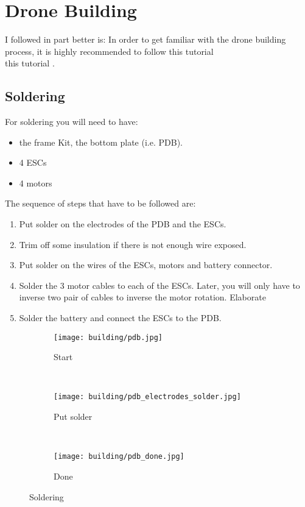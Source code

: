 \chapter{Drone Building}
    I followed in part {\color{red}better is: In order to get familiar with the drone building process, it is highly recommended to follow this tutorial\\} this tutorial \cite{udemy_build_course}.
    
    \section{Soldering}
        For soldering you will need to have:
        \begin{itemize}
            \item the frame Kit, the bottom plate (i.e. PDB).
            \item 4 ESCs
            \item 4 motors
        \end{itemize}
        The sequence of steps that have to be followed are:
        \begin{enumerate}
            \item Put solder on the electrodes of the PDB and the ESCs.
            \item Trim off some insulation if there is not enough wire exposed.
            \item Put solder on the wires of the ESCs, motors and battery connector.
            \item Solder the 3 motor cables to each of the ESCs. Later, you will only have to inverse two pair of cables to inverse the motor rotation. {\color{orange} Elaborate}
            \item Solder the battery and connect the ESCs to the PDB.
        \end{enumerate}
        \begin{figure}[!ht]
            \centering
            \begin{subfigure}[b]{0.3\textwidth}
                \texttt{[image: building/pdb.jpg]}
                \caption{Start}
                \label{fig:pdb}
            \end{subfigure}
            ~
            \begin{subfigure}[b]{0.3\textwidth}
                \texttt{[image: building/pdb\_electrodes\_solder.jpg]}
                \caption{Put solder}
                \label{fig:pdb_electrodes_solder}
            \end{subfigure}
            ~
            \begin{subfigure}[b]{0.3\textwidth}
                \texttt{[image: building/pdb\_done.jpg]}
                \caption{Done}
                \label{fig:pdb_done}
            \end{subfigure}
            \caption{Soldering}\label{fig:soldering}
        \end{figure}
        
